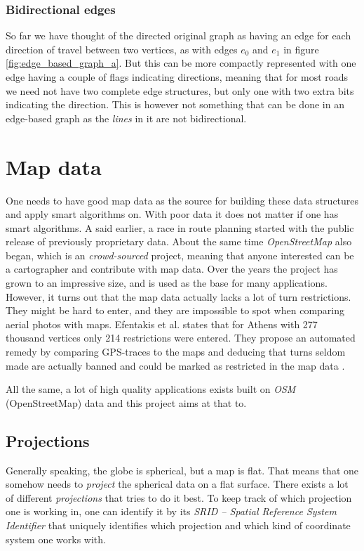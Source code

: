 \documentclass[../main.tex]{subfiles}
\begin{document}
\subsubsection{Bidirectional edges}
So far we have thought of the directed original graph as having an edge for each direction of travel between two vertices, as with edges $e_0$ and $e_1$ in figure \ref{fig:edge_based_graph_a}. But this can be more compactly represented with one edge having a couple of flags indicating directions, meaning that for most roads we need not have two  complete edge structures, but only one with two extra bits indicating the direction. This is however not something that can be done in an edge-based graph as the \emph{lines} in it are not bidirectional.


\section{Map data}
One needs to have good map data as the source for building these data structures and apply smart algorithms on. With poor data it does not matter if one has smart algorithms. A said earlier, a race in route planning started with the public release of previously proprietary data. About the same time \emph{OpenStreetMap} also began, which is an \emph{crowd-sourced} project, meaning that anyone interested can be a cartographer and contribute with map data. Over the years the project has grown to an impressive size, and is used as the base for many applications. However, it turns out that the map data actually lacks a lot of turn restrictions. They might be hard to enter, and they are impossible to spot when comparing aerial photos with maps. Efentakis et al. states that for Athens with 277 thousand vertices only 214 restrictions were entered. They propose an automated remedy by comparing GPS-traces to the maps and deducing that turns seldom made are actually banned and could be marked as restricted in the map data \cite{efentakis-2014}. 

All the same, a lot of high quality applications exists built on \emph{OSM} (OpenStreetMap) data and this project aims at that to.

\subsection{Projections}
Generally speaking, the globe is spherical, but a map is flat. That means that one somehow needs to \textit{project} the spherical data on a flat surface. There exists a lot of different \textit{projections} that tries to do it best. To keep track of which projection one is working in, one can identify it by its \textit{SRID -- Spatial Reference System Identifier} that uniquely identifies which projection and which kind of coordinate system one works with.
\end{document}
